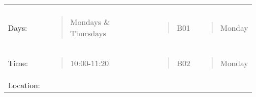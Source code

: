 \begin{longtable}[]{@{}lllll@{}}
\begin{minipage}[t]{0.19\columnwidth}
\end{minipage}\tabularnewline
\begin{minipage}[t]{0.19\columnwidth}\raggedright\strut
Days:\strut
\end{minipage} & \begin{minipage}[t]{0.19\columnwidth}\raggedright\strut
\begin{quote}
Mondays \& Thursdays
\end{quote}\strut
\end{minipage} & \begin{minipage}[t]{0.19\columnwidth}\raggedright\strut
\strut
\end{minipage} & \begin{minipage}[t]{0.19\columnwidth}\raggedright\strut
\begin{quote}
B01
\end{quote}\strut
\end{minipage} & \begin{minipage}[t]{0.19\columnwidth}\raggedright\strut
\begin{quote}
Monday
\end{quote}\strut
\end{minipage}\tabularnewline
\begin{minipage}[t]{0.19\columnwidth}\raggedright\strut
Time:\strut
\end{minipage} & \begin{minipage}[t]{0.19\columnwidth}\raggedright\strut
\begin{quote}
10:00-11:20
\end{quote}\strut
\end{minipage} & \begin{minipage}[t]{0.19\columnwidth}\raggedright\strut
\strut
\end{minipage} & \begin{minipage}[t]{0.19\columnwidth}\raggedright\strut
\begin{quote}
B02
\end{quote}\strut
\end{minipage} & \begin{minipage}[t]{0.19\columnwidth}\raggedright\strut
\begin{quote}
Monday
\end{quote}\strut
\end{minipage}\tabularnewline
\begin{minipage}[t]{0.19\columnwidth}\raggedright\strut
Location:\strut
\end{minipage} & \begin{minipage}[t]{0.19\columnwidth}\raggedright\strut

\end{minipage}
\end{longtable}

